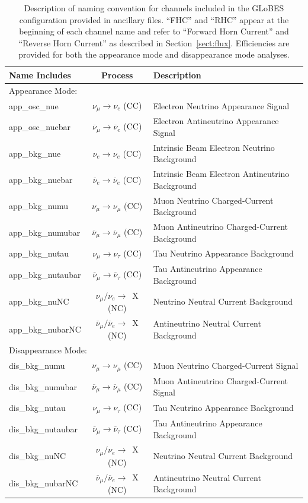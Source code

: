 \documentclass[aps,prd,superscriptaddress]{revtex4-1}
\newcommand{\nue}{\mbox{$\nu_e$}}
\newcommand{\nuebar}{\mbox{$\overline\nu_e$}}
\newcommand{\numu}{\mbox{$\nu_{\mu}$}}
\newcommand{\numubar}{\mbox{$\overline\nu_{\mu}$}}
\newcommand{\nutau}{\mbox{$\nu_{\tau}$}}
\newcommand{\nutaubar}{\mbox{$\overline\nu_{\tau}$}}
\begin{document}
\begin{table}[!htb]
  \centering
  \caption{Description of naming convention for channels included in the GLoBES configuration provided in
    ancillary files.
    ``FHC'' and ``RHC'' appear at the beginning of each channel name and
    refer to ``Forward Horn Current'' and ``Reverse Horn Current'' as described in Section~\ref{sect:flux}. Efficiencies are provided
  for both the appearance mode and disappearance mode analyses.}
  \label{tab:fastmc_naming_convention}
  \begin{tabular}{|lcl|} \hline
    Name Includes & Process & Description \\ \hline\hline
    \multicolumn{3}{|l|}{Appearance Mode:} \\
      app\_osc\_nue & $\numu\rightarrow\nue$ (CC) & Electron Neutrino Appearance Signal \\
      app\_osc\_nuebar & $\numubar\rightarrow\nuebar$ (CC) & Electron Antineutrino Appearance Signal\\
      app\_bkg\_nue & $\nue\rightarrow\nue$ (CC) & Intrinsic Beam Electron Neutrino Background\\
      app\_bkg\_nuebar & $\nuebar\rightarrow\nuebar$ (CC) & Intrinsic Beam Electron Antineutrino Background\\
      app\_bkg\_numu & $\numu\rightarrow\numu$ (CC) & Muon Neutrino Charged-Current Background \\
      app\_bkg\_numubar & $\numubar\rightarrow\numubar$ (CC) & Muon Antineutrino Charged-Current Background \\
      app\_bkg\_nutau & $\numu\rightarrow\nutau$ (CC) & Tau Neutrino Appearance Background \\
      app\_bkg\_nutaubar & $\numubar\rightarrow\nutaubar$ (CC) & Tau Antineutrino Appearance Background \\ 
      app\_bkg\_nuNC & $\numu/\nue\rightarrow$~X (NC) & Neutrino Neutral Current Background \\
      app\_bkg\_nubarNC & $\numubar/\nuebar\rightarrow$~X (NC) & Antineutrino Neutral Current Background \\ \hline

      \multicolumn{3}{|l|}{Disappearance Mode:} \\      
      dis\_bkg\_numu & $\numu\rightarrow\numu$ (CC) & Muon Neutrino Charged-Current Signal\\
      dis\_bkg\_numubar & $\numubar\rightarrow\numubar$ (CC) & Muon Antineutrino Charged-Current Signal\\
      dis\_bkg\_nutau & $\numu\rightarrow\nutau$ (CC) & Tau Neutrino Appearance Background \\
      dis\_bkg\_nutaubar & $\numubar\rightarrow\nutaubar$ (CC) & Tau Antineutrino Appearance Background \\
      dis\_bkg\_nuNC & $\numu/\nue\rightarrow$~X (NC) & Neutrino Neutral Current Background \\
      dis\_bkg\_nubarNC & $\numubar/\nuebar\rightarrow$~X (NC) & Antineutrino Neutral Current Background \\ \hline \hline
  \end{tabular}
\end{table}
\end{document}
